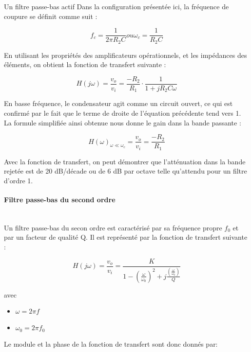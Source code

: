\documentclass[conference,onecolumn]{IEEEtran}
\begin{document}
Un filtre passe-bas actif
Dans la configuration présentée ici, la fréquence de coupure se définit comme suit :

\begin{equation}
    f_c = \frac{1}{2\pi R_2C} ou  \omega_c = \frac{1}{R_2 C}
\end{equation}

En utilisant les propriétés des amplificateurs opérationnels, et les impédances des éléments, on obtient la fonction de transfert suivante :

\begin{equation}
    H(j\omega)= \frac{v_o}{v_i} = \frac{-R_2}{R_1} \cdot \frac{1}{1 + jR_2 C\omega}
\end{equation}

En basse fréquence, le condensateur agit comme un circuit ouvert, ce qui est confirmé par le fait que le terme de droite de l'équation précédente tend vers 1. La formule simplifiée ainsi obtenue nous donne le gain dans la bande passante :

\begin{equation}
    H(\omega)_{\omega \ll \omega_c}  = \frac{v_o}{v_i} = \frac{-R_2}{R_1}
\end{equation}


Avec la fonction de transfert, on peut démontrer que l'atténuation dans la bande rejetée est de 20 dB/décade ou de 6 dB par octave telle qu'attendu pour un filtre d'ordre 1.
\medskip

\paragraph{Filtre passe-bas du second ordre}
\hfill\\
Un filtre passe-bas du secon ordre est caractérisé par sa fréquence propre $f_0$ et par un facteur de qualité Q.  Il est représenté par la fonction de transfert suivante :


\begin{equation}
    H(j\omega) = \frac{v_o}{v_i} = \frac{K}{1 - (\frac{\omega}{\omega_0})^2 + j\frac{(\frac{\omega}{\omega_0})}{Q}}
\end{equation}

avec
\begin{itemize}
  \item[] $\omega =  2\pi f$
  \item[] $\omega_0 = 2\pi f_0$ 
\end{itemize}


Le module et la phase de la fonction de transfert sont donc donnés par:
\end{document}
